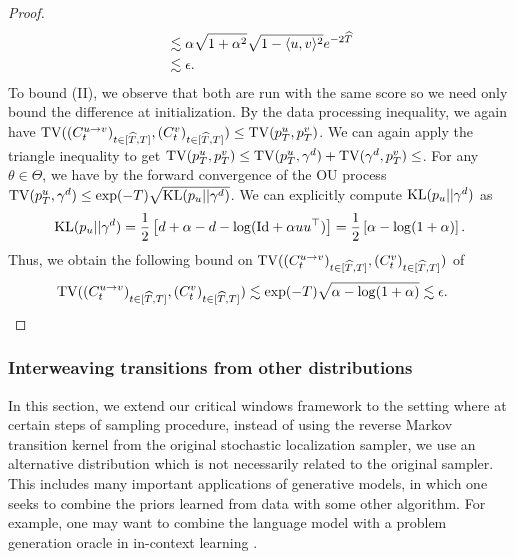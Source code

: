 \begin{proof}
\begin{align*}
&\lesssim \alpha\sqrt{1+\alpha^2} \sqrt{1-\langle u,v\rangle^2} e^{-2\widehat{T}} \\
&\lesssim \epsilon.  
\end{align*}
\noindent To bound (II), we observe that both are run with the same score so we need only bound the difference at initialization. By the data processing inequality, we again have $\mathrm{TV}((C^{u \to v}_t)_{t \in [\widehat{T},T]},(C^{v}_t)_{t \in [\widehat{T},T]}) \leq \mathrm{TV}(p^u_T,p^v_T)$. We can again apply the triangle inequality to get $\mathrm{TV}(p^u_T,p^v_T) \leq \mathrm{TV}(p^u_T,\gamma^d) +\mathrm{TV}(\gamma^d,p^v_T) \leq $. For any $\theta \in \Theta$, we have by the forward convergence of the OU process $\mathrm{TV}(p^u_T,\gamma^d) \leq \exp(-T)\sqrt{\mathrm{KL}(p_u||\gamma^d)}$. We can explicitly compute $\mathrm{KL}(p_u||\gamma^d)$ as 
\begin{align*}
\mathrm{KL}(p_u||\gamma^d) = \frac{1}{2}\left[d+\alpha -d - \log (\mathrm{Id}+ \alpha uu^\top)\right] = \frac{1}{2}\left[\alpha - \log(1+\alpha)\right]. 
\end{align*}
Thus, we obtain the following bound on 
$\mathrm{TV}((C^{u \to v}_t)_{t \in [\widehat{T},T]},(C^{v}_t)_{t \in [\widehat{T},T]})$ of 
\begin{align*}
\mathrm{TV}((C^{u \to v}_t)_{t \in [\widehat{T},T]},(C^{v}_t)_{t \in [\widehat{T},T]}) &\lesssim \exp(-T) \sqrt{\alpha-\log(1+\alpha)} \lesssim \epsilon.  \qedhere
\end{align*}
\end{proof}

\subsubsection{Interweaving transitions from other distributions}\label{app:interweaving}
In this section, we extend our critical windows framework to the setting where at certain steps of sampling procedure, instead of using the reverse Markov transition kernel from the original stochastic localization sampler, we use an alternative distribution which is not necessarily related to the original sampler. This includes many important applications of generative models, in which one seeks to combine the priors learned from data with some other algorithm. For example, one may want to combine the language model with  a problem generation oracle in in-context learning \citep{dong2024surveyincontextlearning}.

